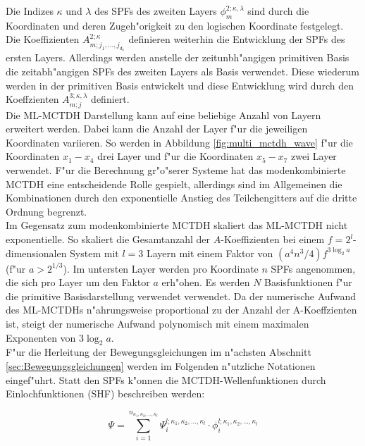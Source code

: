 Die Indizes $\kappa$ und $\lambda$ des SPFs des zweiten Layers $ \phi^{2;\kappa, \lambda}_{m}  $  sind durch die Koordinaten und deren
Zugeh"origkeit zu den logischen Koordinate festgelegt.
Die Koeffizienten $A^{2;\kappa}_{m;j_1,...,j_{d_\kappa}}$ definieren weiterhin die Entwicklung der SPFs des ersten Layers.
Allerdings werden anstelle der zeitunbh"angigen primitiven Basis die zeitabh"angigen SPFs des zweiten Layers als Basis verwendet.
Diese wiederum werden in der primitiven Basis entwickelt und diese Entwicklung wird durch den Koeffzienten  $A^{3;\kappa, \lambda}_{m;j}$
definiert.
  \\Die ML-MCTDH Darstellung kann auf eine beliebige Anzahl von Layern erweitert werden.
Dabei kann die Anzahl der Layer f"ur die jeweiligen Koordinaten variieren.
So werden in Abbildung \ref{fig:multi_mctdh_wave} f"ur die Koordinaten $x_1-x_4$ drei Layer und f"ur die Koordinaten $x_5 - x_7$ zwei Layer verwendet.
F"ur die Berechnung gr"o"serer Systeme hat das modenkombinierte MCTDH eine entscheidende Rolle gespielt, allerdings sind im Allgemeinen die Kombinationen
durch den exponentielle Anstieg des Teilchengitters auf die dritte Ordnung begrenzt. \cite{MCTDHreview3}
  \\Im Gegensatz zum modenkombinierte MCTDH skaliert das ML-MCTDH nicht exponentielle.
So skaliert die Gesamtanzahl der $A$-Koeffizienten bei einem $f=2^l$-dimensionalen System mit $l=3$ Layern mit einem Faktor von $(a^4n^{3}/4)f^{3\log_{2}a}$
(f"ur $a>2^{1/3}$). Im untersten Layer werden pro Koordinate $n$ SPFs angenommen, die sich pro Layer um den Faktor $a$ erh"ohen.
Es werden $N$ Basisfunktionen f"ur die primitive Basisdarstellung verwendet verwendet.
Da der numerische Aufwand des ML-MCTDHs n"ahrungsweise proportional zu der Anzahl der A-Koeffzienten ist, steigt der numerische Aufwand polynomisch
mit einem maximalen Exponenten von $3\log_{2}a$.\cite{Mreview2}
  \\F"ur die Herleitung der Bewegungsgleichungen im n"achsten Abschnitt \ref{sec:Bewegungsgleichungen} werden im Folgenden n"utzliche Notationen eingef"uhrt.
Statt den SPFs k"onnen die MCTDH-Wellenfunktionen durch Einlochfunktionen (SHF) \cite{Mreview2, MCTDHreview3} beschreiben werden:

 \begin{equation}
 \Psi=\sum^{n_{\kappa_1,\kappa_2,...,\kappa_l}}_{i=1} \Psi^{l;\kappa_1,\kappa_2,...,\kappa_l}_{i} \cdot  \phi^{l;\kappa_1,\kappa_2,...,\kappa_l}_{i}
 \label{Eq:MCTDH_SHF}
 \end{equation}

